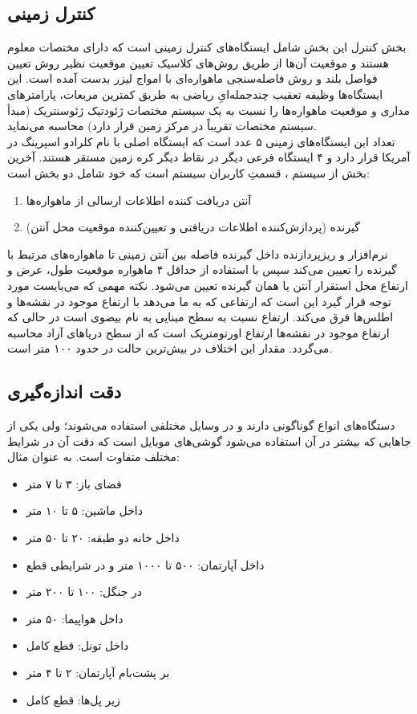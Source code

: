\subsection{کنترل زمینی}
بخش کنترل این بخش شامل ایستگاه‌های کنترل زمینی است که دارای مختصات معلوم هستند و موقعیت آن‌ها از طریق روش‌های کلاسیک تعیین موقعیت نظیر روش تعیین فواصل بلند و روش فاصله‌سنجی ماهواره‌ای با امواج لیزر بدست آمده ‌است. این ایستگاه‌ها وظیفه تعقیب چندجمله‌ایِ ریاضی به طریق کمترین مربعات، پارامترهای مداری و موقعیت ماهواره‌ها را نسبت به یک سیستم مختصات ژئودتیک ژئوسنتریک (مبدأ سیستم مختصات تقریباً در مرکز زمین قرار دارد) محاسبه می‌نماید.
\\
تعداد این ایستگاه‌های زمینی ۵ عدد است که ایستگاه اصلی با نام کلرادو اسپرینگ در آمریکا قرار دارد و ۴ ایستگاه فرعی دیگر در نقاط دیگر کره زمین مستقر هستند. آخرین بخش از سیستم ، قسمتِ کاربران سیستم است که خود شامل دو بخش است:
\begin{enumerate}
	\item آنتن دریافت ‌کننده اطلاعات ارسالی از ماهواره‌ها
	\item گیرنده (پردازش‌کننده اطلاعات دریافتی و تعیین‌کننده موقعیت محل آنتن)
\end{enumerate}
نرم‌افزار و ریزپردازنده داخل گیرنده فاصله بین آنتن زمینی تا ماهواره‌های مرتبط با گیرنده را تعیین می‌کند سپس با استفاده از حداقل ۴ ماهواره موقعیت طول، عرض و ارتفاع محل استقرار آنتن یا همان گیرنده تعیین می‌شود.
نکته مهمی که می‌بایست مورد توجه قرار گیرد این است که ارتفاعی که  به ما می‌دهد با ارتفاع موجود در نقشه‌ها و اطلس‌ها فرق می‌کند. ارتفاع  نسبت به سطح مبنایی به نام بیضوی است در حالی که ارتفاع موجود در نقشه‌ها ارتفاع اورتومتریک است که از سطح دریاهای آزاد محاسبه می‌گردد. مقدار این اختلاف در بیش‌ترین حالت در حدود ۱۰۰ متر است.
\subsection{دقت اندازه‌گیری}
دستگاه‌های  انواع گوناگونی دارند و در وسایل مختلفی استفاده می‌شوند؛ ولی یکی از جاهایی که بیشتر در آن استفاده می‌شود گوشی‌های موبایل است که دقت آن در شرایط مختلف متفاوت است. به عنوان مثال:
\begin{itemize}
	\item فضای باز: ۳ تا ۷ متر
	\item داخل ماشین: ۵ تا ۱۰ متر
	\item داخل خانه دو طبقه: ۲۰ تا ۵۰ متر
	\item داخل آپارتمان: ۵۰۰ تا ۱۰۰۰ متر و در شرایطی قطع
	\item در جنگل: ۱۰۰ تا ۲۰۰ متر
	\item داخل هواپیما: ۵۰ متر
	\item داخل تونل: قطع کامل
	\item بر پشت‌بام آپارتمان: ۲ تا ۴ متر
	\item زیر پل‌ها: قطع کامل
\end{itemize}

